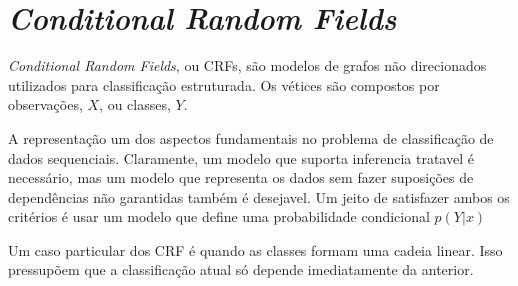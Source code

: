 \section{\textit{Conditional Random Fields}}

\textit{Conditional Random Fields}, ou CRFs, são modelos de grafos não direcionados
utilizados para classificação estruturada. Os vétices são compostos por
observações, $X$, ou classes, $Y$.

A representação um dos aspectos fundamentais no problema de classificação de
dados sequenciais. Claramente, um modelo que suporta inferencia tratavel é
necessário, mas um modelo que representa os dados sem fazer suposições de
dependências não garantidas também é desejavel. Um jeito de satisfazer ambos
os critérios é usar um modelo que define uma probabilidade condicional
$p(Y|x)$

Um caso particular dos CRF é quando as classes formam uma cadeia linear.
Isso pressupõem que a classificação atual só depende imediatamente da
anterior.
